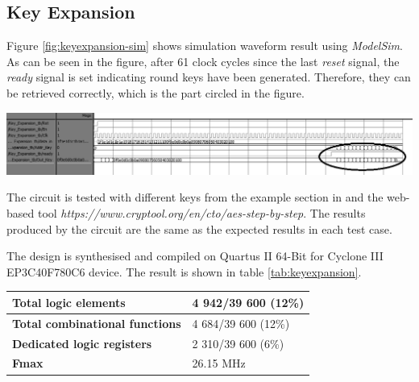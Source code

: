 \documentclass[a4paper, 10pt]{article}
\newenvironment{Figure}
    {\par\medskip\noindent\minipage{\linewidth}}
    {\endminipage\par\medskip}
\begin{document}
\begin{multicols}{2}
        \subsection{Key Expansion}

        Figure \ref{fig:keyexpansion-sim} shows simulation waveform result using \textit{ModelSim}. As can be seen in the figure, after 61 clock cycles since the last \textit{reset} signal, the \textit{ready} signal is set indicating round keys have been generated. Therefore, they can be retrieved correctly, which is the part circled in the figure.

            \begin{Figure}
                \centering
                \includegraphics[width=\linewidth]{KeyExpansion-GetRoundKeysStage-edited.png}
                \label{fig:keyexpansion-sim}
            \end{Figure}

        The circuit is tested with different keys from the example section in \cite{AES} and the web-based tool \textit{https://www.cryptool.org/en/cto/aes-step-by-step}. The results produced by the circuit are the same as the expected results in each test case.

	The design is synthesised and compiled on Quartus II 64-Bit for Cyclone III EP3C40F780C6 device. The result is shown in table \ref{tab:keyexpansion}.

	\noindent
	\begin{center}
		\label{tab:keyexpansion}
                    \begin{tabular}{| m{5.5cm} | m{3cm} |}
		\hline   
		\textbf{Total logic elements} & 4 942/39 600 (12\%)\\
                        \hline
                        \textbf{Total combinational functions} & 4 684/39 600 (12\%)\\
                        \hline
                        \textbf{Dedicated logic registers} & 2 310/39 600 (6\%)\\
                        \hline
				\textbf{Fmax} & 26.15 MHz\\
				\hline
                    \end{tabular}
	\end{center}


\end{multicols}
\end{document}
